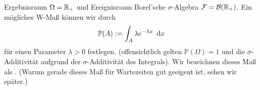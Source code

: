 \begin{beispiel}
    Ergebnisraum $\Omega = \mathbb{R}_+$ und Ereignisraum Borel'sche $\sigma$-Algebra $\mathcal{F} = \mathcal{B}(\mathbb{R}_+)$. Ein mögliches W-Maß können wir durch
    \begin{align*}
        \mathbb{P}(A) \mathrel{:=} \int_A \lambda e^{-\lambda x} \enskip \mathrm{d}x
    \end{align*}
    für einen Parameter $\lambda > 0$ festlegen. (offensichtlich gelten $\mathbb{P}(\Omega) = 1$ und die $\sigma$-Additivität aufgrund der $\sigma$-Additivität des Integrals). Wir bezeichnen dieses Maß als . (Warum gerade dieses Maß für Wartezeiten gut geeigent ist, sehen wir später.)
\end{beispiel}